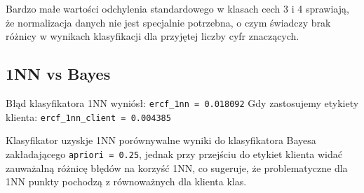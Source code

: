 \documentclass[11pt]{article}
\begin{document}
Bardzo małe wartości odchylenia standardowego w klasach cech 3 i 4 sprawiają, że normalizacja danych nie jest specjalnie potrzebna, o czym świadczy brak różnicy w wynikach klasyfikacji dla przyjętej liczby cyfr znaczących.

\subsection{1NN vs Bayes}\label{nn-vs-bayes}

Błąd klasyfikatora 1NN wyniósł: \texttt{ercf\_1nn\ =\ 0.018092} Gdy
zastosujemy etykiety klienta: \texttt{ercf\_1nn\_client\ =\ 0.004385}

Klasyfikator uzyskje 1NN porównywalne wyniki do klasyfikatora Bayesa
zakładającego \texttt{apriori\ =\ 0.25}, jednak przy przejściu do
etykiet klienta widać zauważalną różnicę błędów na korzyść 1NN, co
sugeruje, że problematyczne dla 1NN punkty pochodzą z równoważnych dla
klienta klas.


    
    
    
    
\end{document}
